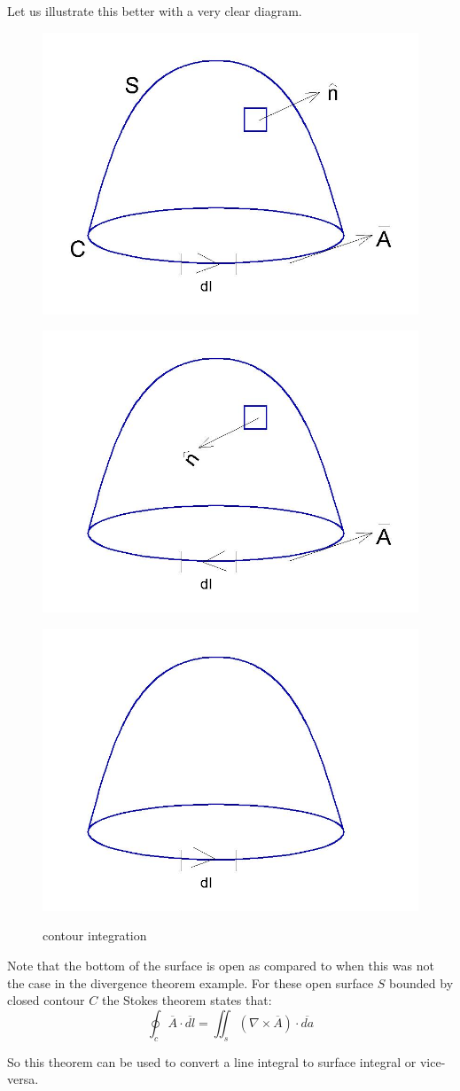 Let us illustrate this better with a very clear diagram. 
\begin{figure}[h]
\centering
\begin{minipage}{.25\textwidth}
\centering
\includegraphics[width=.4\linewidth]{./graphics/fig177}
\label{}
\end{minipage}%
\begin{minipage}{.25\textwidth}
\centering
\includegraphics[width=.4\linewidth]{./graphics/fig177b}
\label{}
\end{minipage}
\begin{minipage}{.5\textwidth}
\centering
\includegraphics[width=.4\linewidth]{./graphics/fig177c}
\label{}
\end{minipage}%
\caption{contour integration}
\end{figure}

Note that the bottom of the surface is open as compared to when this was not the case in the divergence theorem example. For these open surface $S$ bounded by closed contour $C$ the Stokes theorem states that:
\begin{equation}
\oint_c \overline{A} \cdot \overline{dl} = \iint_s  (\nabla \times \overline{A})\cdot\overline{da}
\end{equation}

So this theorem can be used to convert a line integral to surface integral or vice-versa.

